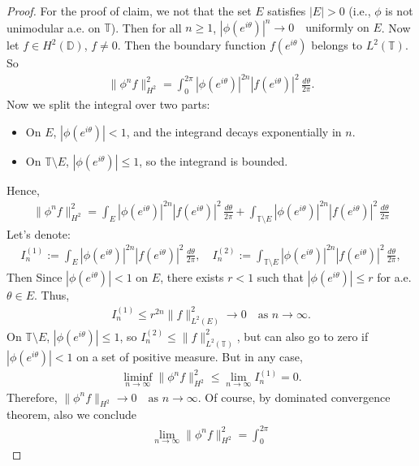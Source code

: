 \documentclass[10pt,a4paper]{amsart}
\begin{document}
\begin{proof}
For the proof of claim, we not that the set $E$ satisfies $|E| >
0$ (i.e., $\phi$ is not unimodular a.e. on $\mathbb{T}$). Then for
all $n \geq 1$, $|\phi(e^{i\theta})|^n \to 0 \quad \text{uniformly
on } E$. Now let $f \in H^2(\mathbb{D})$, $f \neq 0$. Then the
boundary function $f(e^{i\theta})$ belongs to $L^2(\mathbb{T})$.
So
\begin{eqnarray*}
\|\phi^n f\|_{H^2}^2 = \int_0^{2\pi} |\phi(e^{i\theta})|^{2n}
|f(e^{i\theta})|^2 \, \frac{d\theta}{2\pi}.
\end{eqnarray*}
Now we split the integral over two parts:
\begin{itemize}
\item[(i)] On $E$, $|\phi(e^{i\theta})| < 1$, and the integrand
decays exponentially in $n$. \item[(ii)] On $\mathbb{T} \setminus
E$, $|\phi(e^{i\theta})| \leq 1$, so the integrand is bounded.
\end{itemize}
  Hence,
\begin{eqnarray*}
\|\phi^n f\|_{H^2}^2 = \int_E |\phi(e^{i\theta})|^{2n}
|f(e^{i\theta})|^2 \, \frac{d\theta}{2\pi} + \int_{\mathbb{T}
\setminus E} |\phi(e^{i\theta})|^{2n} |f(e^{i\theta})|^2 \,
\frac{d\theta}{2\pi}
\end{eqnarray*}
Let's denote:
\begin{eqnarray*}
I_n^{(1)} := \int_E |\phi(e^{i\theta})|^{2n} |f(e^{i\theta})|^2 \,
\frac{d\theta}{2\pi}, \quad I_n^{(2)} := \int_{\mathbb{T}
\setminus E} |\phi(e^{i\theta})|^{2n} |f(e^{i\theta})|^2 \,
\frac{d\theta}{2\pi},
\end{eqnarray*}
Then Since $|\phi(e^{i\theta})| < 1$ on $E$, there exists $r < 1$
such that $|\phi(e^{i\theta})| \leq r$ for a.e. $\theta \in E$.
Thus,
\begin{eqnarray*}
I_n^{(1)} \leq r^{2n} \|f\|_{L^2(E)}^2 \to 0 \quad \text{as } n
\to \infty.
\end{eqnarray*}
On $\mathbb{T} \setminus E$, $|\phi(e^{i\theta})| \leq 1$, so
$I_n^{(2)} \leq \|f\|_{L^2(\mathbb{T})}^2$, but can also go to
zero if $|\phi(e^{i\theta})| < 1$ on a set of positive measure.
But in any case,
\begin{eqnarray*}
\liminf_{n \to \infty} \|\phi^n f\|_{H^2}^2 \leq \lim_{n \to
\infty} I_n^{(1)} = 0.
\end{eqnarray*}
Therefore, $\|\phi^n f\|_{H^2} \to 0 \quad \text{as } n \to
\infty$. Of course, by dominated convergence theorem, also we
conclude
\begin{eqnarray*}
\lim_{n\rightarrow\infty}\|\phi^n f\|_{H^2}^2 = \int_0^{2\pi}

\end{eqnarray*}
\end{proof}
\end{document}
